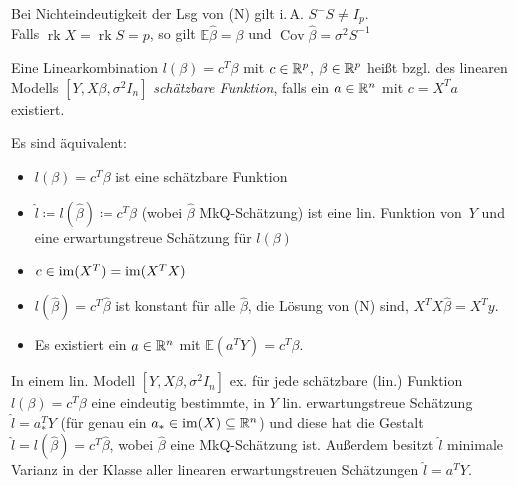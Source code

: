 \documentclass{cheat-sheet}
\newcommand{\E}{\mathbb{E}} %
\DeclareMathOperator{\rk}{rk} %
\DeclareMathOperator{\cov}{Cov} %
\begin{document}
\begin{bem}
  Bei Nichteindeutigkeit der Lsg von (N) gilt i.\,A. $S^{-} S \neq I_p$. \\
  Falls $\rk X = \rk S = p$, so gilt $\E \hat{\beta} = \beta$ und $\cov \hat{\beta} = \sigma^2 S^{-1}$
\end{bem}


\begin{defn}
  Eine Linearkombination $l(\beta) = c^T \beta$ mit $c \in \mathbb{R}^p$, $\beta \in \mathbb{R}^p$ heißt bzgl. des linearen Modells $[Y, X \beta, \sigma^2 I_n]$ \emph{schätzbare Funktion}, falls ein $a \in \mathbb{R}^n$ mit $c = X^T a$ existiert.
\end{defn}


\begin{satz}
  Es sind äquivalent:
  \begin{itemize}
    \item $l(\beta) = c^T \beta$ ist eine schätzbare Funktion
    \item $\hat{l} \coloneqq l(\hat{\beta}) \coloneqq c^T \hat{\beta}$ (wobei $\hat{\beta}$ MkQ-Schätzung) ist eine lin. Funktion von~$Y$ und eine erwartungstreue Schätzung für $l(\beta)$ %
    \item $c \in \operatorname{im}(X^T) = \operatorname{im}(X^T X)$
    \item $l(\hat{\beta}) = c^T \hat{\beta}$ ist konstant für alle $\hat{\beta}$, die Lösung von (N) sind, \dh{} $X^T X \hat{\beta} = X^T y$.
    \item Es existiert ein $a \in \mathbb{R}^n$ mit $\E (a^T Y) = c^T \beta$.
  \end{itemize}
\end{satz}


\begin{satz}
  In einem lin. Modell $[Y, X \beta, \sigma^2 I_n]$ ex. für jede schätzbare (lin.) Funktion $l(\beta) = c^T \beta$ eine eindeutig bestimmte, in $Y$ lin. erwartungstreue Schätzung $\hat{l} = a_*^T Y$ (für genau ein $a_* \in \operatorname{im}(X) \subseteq \mathbb{R}^n$) und diese hat die Gestalt $\hat{l} = l(\hat{\beta}) = c^T \hat{\beta}$, wobei $\hat{\beta}$ eine MkQ-Schätzung ist.
  Außerdem besitzt $\hat{l}$ minimale Varianz in der Klasse aller linearen erwartungstreuen Schätzungen $\hat{l} = a^T Y$.
\end{satz}
\end{document}
